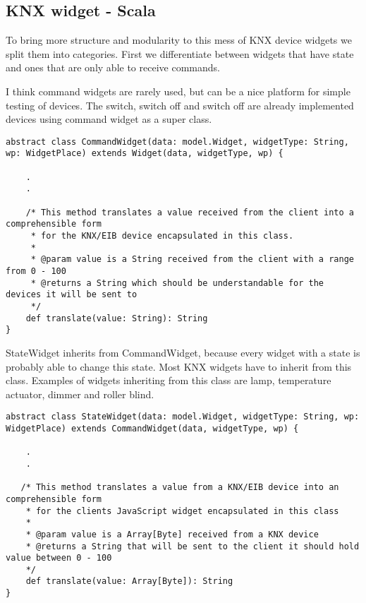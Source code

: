 \subsection{KNX widget - Scala}
    To bring more structure and modularity to this mess of KNX device widgets we split them into categories. First we differentiate between widgets that have state and ones that are only able to receive commands.

    I think command widgets are rarely used, but can be a nice platform for simple testing of devices. The switch, switch off and switch off are already implemented devices using command widget as a super class.
\begin{lstlisting}[caption=CommandWidget: discovery.html,label=lst:h2h:commandwidget]
abstract class CommandWidget(data: model.Widget, widgetType: String, wp: WidgetPlace) extends Widget(data, widgetType, wp) {

    .
    .

 	/* This method translates a value received from the client into a comprehensible form
     * for the KNX/EIB device encapsulated in this class.
     *
     * @param value is a String received from the client with a range from 0 - 100
     * @returns a String which should be understandable for the devices it will be sent to
 	 */
    def translate(value: String): String
}
\end{lstlisting}

    StateWidget inherits from CommandWidget, because every widget with a state is probably able to change this state. Most KNX widgets have to inherit from this class. Examples of widgets inheriting from this class are lamp, temperature actuator, dimmer and roller blind.
\begin{lstlisting}[caption=StateWidget: Widget.scala,label=lst:h2h:statewidget]
abstract class StateWidget(data: model.Widget, widgetType: String, wp: WidgetPlace) extends CommandWidget(data, widgetType, wp) {

    .
    .

   /* This method translates a value from a KNX/EIB device into an comprehensible form
    * for the clients JavaScript widget encapsulated in this class
    *
    * @param value is a Array[Byte] received from a KNX device
    * @returns a String that will be sent to the client it should hold value between 0 - 100
    */
    def translate(value: Array[Byte]): String
}
\end{lstlisting}

